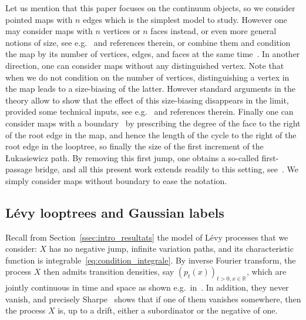 \documentclass[british, a4paper,11pt]{article}
\numberwithin{equation}{section}
\theoremstyle{definition}
\newcommand{\R}{\mathbb{R}}
\begin{document}
Let us mention that this paper focuses on the continuum objects, so we consider pointed maps with $n$ edges which is the simplest model to study. However one may consider maps with $n$ vertices or $n$ faces instead, or even more general notions of size, see e.g.~\cite[Section~6.4]{Mar19} and references therein, or combine them and condition the map by its number of vertices, edges, and faces at the same time~\cite{KM23}. In another direction, one can consider maps without any distinguished vertex. Note that when we do not condition on the number of vertices, 
distinguishing a vertex in the map leads to a size-biasing of the latter. However standard arguments in the theory allow to show that the effect of this size-biasing disappears in the limit, provided some technical inputs, see e.g.~\cite[Proposition~6.4]{Mar19} and references therein.
Finally one can consider maps with a boundary~\cite{Bet15,BM17} by prescribing the degree of the face to the right of the root edge in the map, and hence the length of the cycle to the right of the root edge in the looptree, so finally the size of the first increment of the {\L}ukasiewicz path. By removing this first jump, one obtains a so-called first-passage bridge, and all this present work extends readily to this setting, see~\cite{Mar19, Mar24}.
We simply consider maps without boundary to ease the notation.



\subsection{L\'evy looptrees and Gaussian labels}
\label{ssec:Levy_looptrees_labels}


Recall from Section~\ref{ssec:intro_resultats} the model of L\'evy processes that we consider: $X$ has no negative jump, infinite variation paths, and its characteristic function is integrable~\eqref{eq:condition_integrale}. 
By inverse Fourier transform, the process $X$ then admits transition densities, say $(p_t(x))_{t > 0, x \in \R}$, which are jointly continuous in time and space as shown e.g.~in~\cite[Lemma~2.4]{Kni96}.
In addition, they never vanish, and precisely Sharpe~\cite{Sha69} shows that if one of them vanishes somewhere, then the process $X$ is, up to a drift, either a subordinator or the negative of one.
\end{document}
